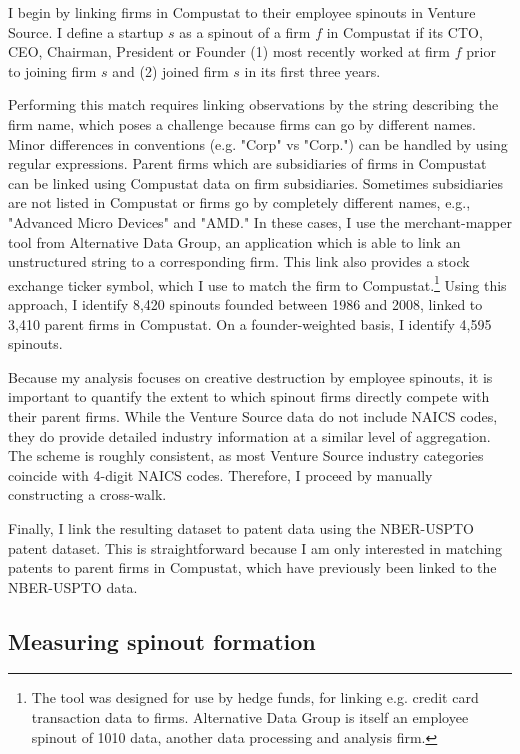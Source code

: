 \documentclass[12pt,english]{article}
\theoremstyle{remark}
\begin{document}
I begin by linking firms in Compustat to their employee spinouts in Venture Source. I define a startup $s$ as a spinout of a firm $f$ in Compustat if its CTO, CEO, Chairman, President or Founder (1) most recently worked at firm $f$ prior to joining firm $s$ and (2) joined firm $s$ in its first three years.

Performing this match requires linking observations by the string describing the firm name, which poses a challenge because firms can go by different names. Minor differences in conventions (e.g. "Corp" vs "Corp.") can be handled by using regular expressions. Parent firms which are subsidiaries of firms in Compustat can be linked using Compustat data on firm subsidiaries. Sometimes subsidiaries are not listed in Compustat or firms go by completely different names, e.g., "Advanced Micro Devices" and "AMD."  In these cases, I use the merchant-mapper tool from Alternative Data Group, an application which is able to link an unstructured string to a corresponding firm. This link also provides a stock exchange ticker symbol, which I use to match the firm to Compustat.\footnote{The tool was designed for use by hedge funds, for linking e.g. credit card transaction data to firms. Alternative Data Group is itself an employee spinout of 1010 data, another data processing and analysis firm.} Using this approach, I identify 8,420 spinouts founded between 1986 and 2008, linked to 3,410 parent firms in Compustat. On a founder-weighted basis, I identify 4,595 spinouts.

Because my analysis focuses on creative destruction by employee spinouts, it is important to quantify the extent to which spinout firms directly compete with their parent firms. While the Venture Source data do not include NAICS codes, they do provide detailed industry information at a similar level of aggregation. The scheme is roughly consistent, as most Venture Source industry categories coincide with 4-digit NAICS codes. Therefore, I proceed by manually constructing a cross-walk.

Finally, I link the resulting dataset to patent data using the NBER-USPTO patent dataset. This is straightforward because I am only interested in matching patents to parent firms in Compustat, which have previously been linked to the NBER-USPTO data.

\subsection{Measuring spinout formation}
\end{document}
